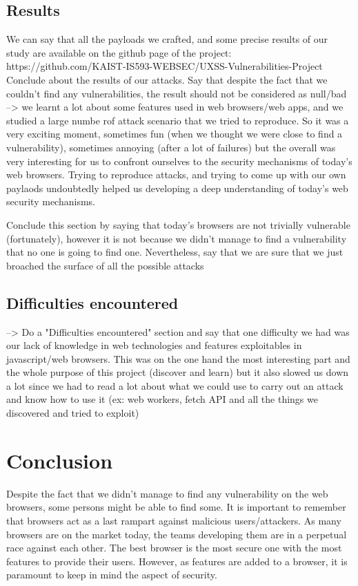 \documentclass[journal]{IEEEtran}
\begin{document}
\subsection{Results}

We can say that all the payloads we crafted, and some precise results of our study are available on the github page of the project: https://github.com/KAIST-IS593-WEBSEC/UXSS-Vulnerabilities-Project
Conclude about the results of our attacks. Say that despite the fact that we couldn't find any vulnerabilities, the result should not be considered as null/bad --> we learnt a lot about some features used in web browsers/web apps, and we studied a large numbe rof attack scenario that we tried to reproduce. So it was a very exciting moment, sometimes fun (when we thought we were close to find a vulnerability), sometimes annoying (after a lot of failures) but the overall was very interesting for us to confront ourselves to the security mechanisms of today's web browsers. Trying to reproduce attacks, and trying to come up with our own paylaods undoubtedly helped us developing a deep understanding of today's web security mechanisms.

Conclude this section by saying that today's browsers are not trivially vulnerable (fortunately), however it is not because we didn't manage to find a vulnerability that no one is going to find one. 
Nevertheless, say that we are sure that we just broached the surface of all the possible attacks 

\subsection{Difficulties encountered}

--> Do a "Difficulties encountered" section and say that one difficulty we had was our lack of knowledge in web technologies and features exploitables in javascript/web browsers. This was on the one hand the most interesting part and the whole purpose of this project (discover and learn) but it also slowed us down a lot since we had to read a lot about what we could use to carry out an attack and know how to use it (ex: web workers, fetch API and all the things we discovered and tried to exploit)


\section{Conclusion}
Despite the fact that we didn't manage to find any vulnerability on the web browsers, some persons might be able to find some. It is important to remember that browsers act as a last rampart against malicious users/attackers. As many browsers are on the market today, the teams developing them are in a perpetual race against each other. The best browser is the most secure one with the most features to provide their users. However, as features are added to a browser, it is paramount to keep in mind the aspect of security.
\end{document}
